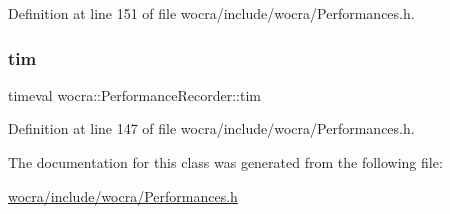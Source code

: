 Definition at line 151 of file wocra/include/wocra/\+Performances.\+h.

\hypertarget{classwocra_1_1PerformanceRecorder_ad66f50acd0ca84db58c753406e25da75}{}\label{classwocra_1_1PerformanceRecorder_ad66f50acd0ca84db58c753406e25da75} 
\subsubsection{\texorpdfstring{tim}{tim}}
{\footnotesize\ttfamily timeval wocra\+::\+Performance\+Recorder\+::tim\hspace{0.3cm}{\ttfamily [protected]}}



Definition at line 147 of file wocra/include/wocra/\+Performances.\+h.



The documentation for this class was generated from the following file\+:\begin{DoxyCompactItemize}
\item 
\hyperlink{wocra_2include_2wocra_2Performances_8h}{wocra/include/wocra/\+Performances.\+h}\end{DoxyCompactItemize}
